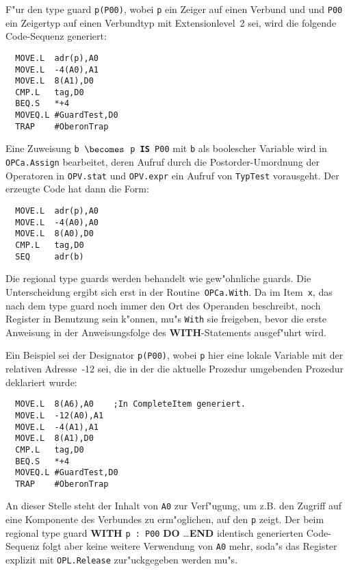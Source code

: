 F"ur den type guard {\tt p(P00)}, wobei {\tt p} ein Zeiger auf einen Verbund und
und {\tt P00} ein Zeigertyp auf einen Verbundtyp mit Extensionlevel~2 sei,
wird die folgende Code-Sequenz generiert:
\begin{verbatim}
  MOVE.L  adr(p),A0
  MOVE.L  -4(A0),A1
  MOVE.L  8(A1),D0
  CMP.L   tag,D0
  BEQ.S   *+4
  MOVEQ.L #GuardTest,D0
  TRAP    #OberonTrap
\end{verbatim}

Eine Zuweisung {\tt b $\becomes$ p {\bf IS} P00} mit {\tt b} als boolescher
Variable wird in {\tt OPCa.Assign} bearbeitet, deren Aufruf durch die
Postorder-Umordnung der Operatoren in {\tt OPV.stat} und {\tt OPV.expr}
ein Aufruf von {\tt TypTest} vorausgeht.
Der erzeugte Code hat dann die Form:
\begin{verbatim}
  MOVE.L  adr(p),A0
  MOVE.L  -4(A0),A0
  MOVE.L  8(A0),D0
  CMP.L   tag,D0
  SEQ     adr(b)
\end{verbatim}

Die regional type guards werden behandelt wie gew"ohnliche guards.
Die Unterscheidung ergibt sich erst in der Routine~{\tt OPCa.With}.
Da im Item~{\tt x}, das nach dem type guard noch immer den Ort des
Operanden beschreibt, noch Register in Benutzung sein k"onnen,
mu"s {\tt With} sie freigeben, bevor die erste Anweisung in der
Anweisungsfolge des {\bf WITH}-Statements ausgef"uhrt wird.

Ein Beispiel sei der Designator {\tt p(P00)}, wobei {\tt p} hier
eine lokale Variable mit der relativen Adresse~-12 sei, die in der die
aktuelle Prozedur umgebenden Prozedur deklariert wurde:
\begin{verbatim}
  MOVE.L  8(A6),A0    ;In CompleteItem generiert.
  MOVE.L  -12(A0),A1
  MOVE.L  -4(A1),A1
  MOVE.L  8(A1),D0
  CMP.L   tag,D0
  BEQ.S   *+4
  MOVEQ.L #GuardTest,D0
  TRAP    #OberonTrap
\end{verbatim}
An dieser Stelle steht der Inhalt von {\tt A0} zur Verf"ugung, um
z.B. den Zugriff auf eine Komponente des Verbundes zu erm"oglichen,
auf den {\tt p} zeigt.
Der beim regional type guard {\bf WITH} {\tt p : P00} {\bf DO} \ldots {\bf END}
identisch generierten Code-Sequenz folgt aber keine weitere Verwendung
von {\tt A0} mehr, soda"s das Register explizit mit {\tt OPL.Release}
zur"uckgegeben werden mu"s.




